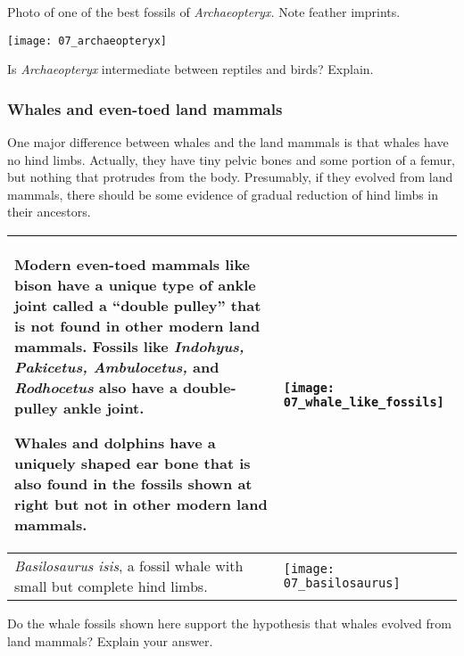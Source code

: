 \documentclass[12pt, hidelinks]{exam}
\begin{document}
\vspace*{\baselineskip}

Photo of one of the best fossils of \textit{Archaeopteryx.} Note feather imprints.

\begin{center}\texttt{[image: 07\_archaeopteryx]}\end{center}

\begin{questions}

\question[3]
Is \emph{Archaeopteryx} intermediate between reptiles and
birds? Explain. 

\newpage

\subsubsection*{Whales and even-toed land mammals}

One major difference between whales and the land
mammals is that whales have no hind limbs. Actually, they have tiny
pelvic bones and some portion of a femur, but nothing that protrudes
from the body. Presumably, if they evolved from land mammals, there
should be some evidence of gradual reduction of hind limbs in their
ancestors.

\begin{tabular}{@{}L{0.35\textwidth}R{0.6\textwidth}@{}}
\toprule
Modern even-toed mammals like bison have a unique type of ankle joint called a ``double pulley'' that is not found in other modern land mammals. Fossils like \textit{Indohyus, Pakicetus, Ambulocetus,} and \textit{Rodhocetus} also have a double-pulley ankle joint. 

\vspace*{\baselineskip} 

Whales and dolphins have a uniquely shaped ear bone that is also found in the fossils shown at right but not in other modern land mammals. &

\texttt{[image: 07\_whale\_like\_fossils]}\\[\baselineskip]

\midrule
\textit{Basilosaurus isis}, a fossil whale with small but complete hind
limbs. &
\texttt{[image: 07\_basilosaurus]} \\
\bottomrule
\end{tabular}



\question[3]
Do the whale fossils shown here support the hypothesis that
whales evolved from land mammals? Explain your answer.


\end{questions}
\end{document}
